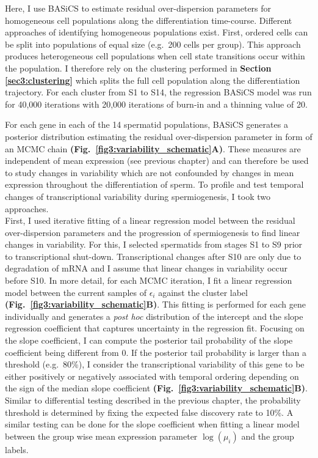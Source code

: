 Here, I use BASiCS to estimate residual over-dispersion parameters for homogeneous cell populations along the differentiation time-course. Different approaches of identifying homogeneous populations exist. First, ordered cells can be split into populations of equal size (e.g.~200 cells per group). This approach produces heterogeneous cell populations when cell state transitions occur within the population. I therefore rely on the clustering performed in \textbf{Section \ref{sec3:clustering}} which splits the full cell population along the differentiation trajectory. For each cluster from S1 to S14, the regression BASiCS model was run for 40,000 iterations with 20,000 iterations of burn-in and a thinning value of 20. 

\newpage

For each gene in each of the 14 spermatid populations, BASiCS generates a posterior distribution estimating the residual over-dispersion parameter in form of an MCMC chain \textbf{(Fig.~\ref{fig3:variability_schematic}A)}. These measures are independent of mean expression (see previous chapter) and can therefore be used to study changes in variability which are not confounded by changes in mean expression throughout the differentiation of sperm. To profile and test temporal changes of transcriptional variability during spermiogenesis, I took two approaches. \\

First, I used iterative fitting of a linear regression model between the residual over-dispersion parameters and the progression of spermiogenesis to find linear changes in variability. For this, I selected spermatids from stages S1 to S9 prior to transcriptional shut-down. Transcriptional changes after S10 are only due to degradation of mRNA and I assume that linear changes in variability occur before S10. In more detail, for each MCMC iteration, I fit a linear regression model between the current samples of $\epsilon_i$ against the cluster label \textbf{(Fig.~\ref{fig3:variability_schematic}B)}. This fitting is performed for each gene individually and generates a \emph{post hoc} distribution of the intercept and the slope regression coefficient that captures uncertainty in the regression fit. Focusing on the slope coefficient, I can compute the posterior tail probability of the slope coefficient being different from 0. If the posterior tail probability is larger than a threshold (e.g.~80\%), I consider the transcriptional variability of this gene to be either positively or negatively associated with temporal ordering depending on the sign of the median slope coefficient \textbf{(Fig.~\ref{fig3:variability_schematic}B)}. Similar to differential testing described in the previous chapter, the probability threshold is determined by fixing the expected false discovery rate to 10\%. A similar testing can be done for the slope coefficient when fitting a linear model between the group wise mean expression parameter $\log(\mu_i)$ and the group labels.\\

